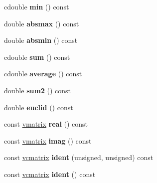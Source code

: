 \begin{DoxyCompactItemize}
\item 
cdouble {\bfseries min} () const \hypertarget{classvcmatrix_a9a8204c30886a57fdb0f3d259f28ace2}{}\label{classvcmatrix_a9a8204c30886a57fdb0f3d259f28ace2}

\item 
double {\bfseries absmax} () const \hypertarget{classvcmatrix_a9e3f4dd78557d8c031853b579dcab74a}{}\label{classvcmatrix_a9e3f4dd78557d8c031853b579dcab74a}

\item 
double {\bfseries absmin} () const \hypertarget{classvcmatrix_aefbc3ca95448629a318363543f75f053}{}\label{classvcmatrix_aefbc3ca95448629a318363543f75f053}

\item 
cdouble {\bfseries sum} () const \hypertarget{classvcmatrix_a1b821d205390713b09506196541dd3ac}{}\label{classvcmatrix_a1b821d205390713b09506196541dd3ac}

\item 
cdouble {\bfseries average} () const \hypertarget{classvcmatrix_a80228d60fc78c576117e60bf9fc979a9}{}\label{classvcmatrix_a80228d60fc78c576117e60bf9fc979a9}

\item 
double {\bfseries sum2} () const \hypertarget{classvcmatrix_adb83f3a19d4e3b632ff0ab1a4209e7f4}{}\label{classvcmatrix_adb83f3a19d4e3b632ff0ab1a4209e7f4}

\item 
double {\bfseries euclid} () const \hypertarget{classvcmatrix_ac0ee95cfc8dfb26b9c5671f94d348933}{}\label{classvcmatrix_ac0ee95cfc8dfb26b9c5671f94d348933}

\item 
const \hyperlink{classvmatrix}{vmatrix} {\bfseries real} () const \hypertarget{classvcmatrix_a55f4365bde6c9d3d64584ee2aca13e92}{}\label{classvcmatrix_a55f4365bde6c9d3d64584ee2aca13e92}

\item 
const \hyperlink{classvmatrix}{vmatrix} {\bfseries imag} () const \hypertarget{classvcmatrix_aa09ed01f526367a2acd899f0c1010001}{}\label{classvcmatrix_aa09ed01f526367a2acd899f0c1010001}

\item 
const \hyperlink{classvcmatrix}{vcmatrix} {\bfseries ident} (unsigned, unsigned) const \hypertarget{classvcmatrix_a2dca1eda2696a2780befc62cba1eb6c0}{}\label{classvcmatrix_a2dca1eda2696a2780befc62cba1eb6c0}

\item 
const \hyperlink{classvcmatrix}{vcmatrix} {\bfseries ident} () const \hypertarget{classvcmatrix_aa00b1774adb991a7d01afeb4da3ddca4}{}\label{classvcmatrix_aa00b1774adb991a7d01afeb4da3ddca4}


\end{DoxyCompactItemize}
